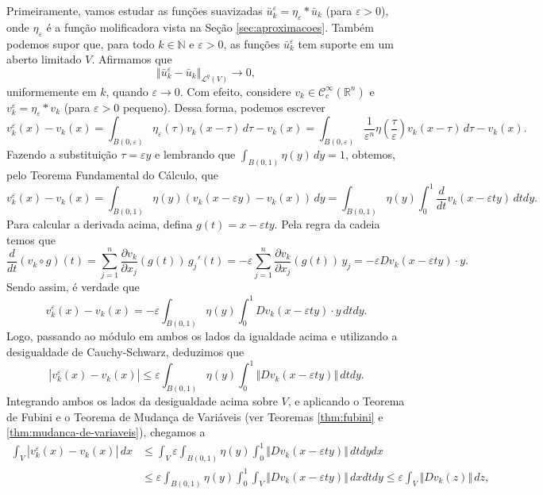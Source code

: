 \documentclass[a4paper, 11pt]{book}
\theoremstyle{definition}
\newcommand{\bN}{\mathbb{N}}
\newcommand{\bR}{\mathbb{R}}
\newcommand{\cC}{\mathcal{C}}
\newcommand{\cL}{\mathcal{L}}
\begin{document}
\begin{prf}
    Primeiramente, vamos estudar as funções suavizadas $\bar u_k^\varepsilon = \eta_\varepsilon * \bar u_k$ (para $\varepsilon > 0$), onde $\eta_\varepsilon$ é a função molificadora vista na Seção \ref{sec:aproximacoes}.
    Também podemos supor que, para todo $k \in \bN$ e $\varepsilon > 0$, as funções $\bar u_k^\varepsilon$ tem suporte em um aberto limitado $V$.
    Afirmamos que
    \[
        \Vert \bar u_k^\varepsilon - \bar u_k \Vert_{\cL^q(V)} \to 0,
    \]
    uniformemente em $k$, quando $\varepsilon \to 0$.
    Com efeito, considere $v_k \in \cC^{\infty}_c(\bR^n)$ e $v_k^\varepsilon = \eta_\varepsilon * v_k$ (para $\varepsilon > 0$ pequeno).
    Dessa forma, podemos escrever
    \[
        v_k^\varepsilon(x) - v_k(x) = \int_{B(0,\varepsilon)} \eta_\varepsilon(\tau) v_k (x - \tau) \,d\tau - v_k(x)  = \int_{B(0,\varepsilon)} \frac{1}{\varepsilon^n} \eta \left( \frac{\tau}{\varepsilon} \right) v_k (x - \tau) \,d\tau - v_k(x).
    \]
    Fazendo a substituição $\tau = \varepsilon y$ e lembrando que $\int_{B(0,1)} \eta(y) \,dy = 1$, obtemos, pelo Teorema Fundamental do Cálculo, que
    \[
        v_k^\varepsilon(x) - v_k(x) = \int_{B(0,1)} \eta(y) \left( v_k(x - \varepsilon y) - v_k(x) \right) \,dy = \int_{B(0,1)} \eta(y) \int_0^1 \frac{d}{dt}v_k(x - \varepsilon t y) \,dt dy.
    \]
    Para calcular a derivada acima, defina $g(t) = x - \varepsilon t y$. Pela regra da cadeia temos que
    \[
        \frac{d}{dt} (v_k \circ g)(t) = \sum_{j=1}^n \dfrac{\partial v_k}{\partial x_j} (g(t)) \, g_j'(t) = -\varepsilon\sum_{j=1}^{n} \dfrac{\partial v_k}{\partial x_j}(g(t)) \,y_j = -\varepsilon Dv_k(x - \varepsilon ty) \cdot y.
    \]
    Sendo assim, é verdade que
    \[
        v_k^\varepsilon(x) - v_k(x) = -\varepsilon \int_{B(0,1)} \eta(y) \int_0^1 Dv_k(x - \varepsilon ty) \cdot y \,dtdy.
    \]
    Logo, passando ao módulo em ambos os lados da igualdade acima e utilizando a desigualdade de Cauchy-Schwarz, deduzimos que
    \[
        |v_k^\varepsilon(x) - v_k(x)| \leqslant \varepsilon \int_{B(0,1)} \eta(y) \int_0^1 \Vert Dv_k(x - \varepsilon ty) \Vert \,dtdy.
    \]
    Integrando ambos os lados da desigualdade acima sobre $V$, e aplicando o Teorema de Fubini e o Teorema de Mudança de Variáveis (ver Teoremas \ref{thm:fubini} e \ref{thm:mudanca-de-variaveis}), chegamos a
    \[
        \begin{aligned}
            \int_{V} |v_k^\varepsilon(x) - v_k(x)|\,dx &\leqslant \int_{V} \varepsilon \int_{B(0,1)} \eta(y) \int_0^1 \Vert Dv_k(x - \varepsilon ty) \Vert \,dtdydx\\
            &\leqslant \varepsilon \int_{B(0,1)} \eta(y) \int_0^1 \int_{V} \Vert Dv_k(x - \varepsilon ty) \Vert \,dxdtdy \leqslant \varepsilon \int_{V} \Vert Dv_k(z) \Vert    \,dz,

\end{aligned}\]
\end{prf}
\end{document}

